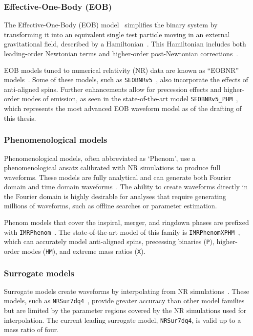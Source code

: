 \subsubsection{Effective-One-Body (EOB)}

The Effective-One-Body (EOB) model~\cite{EOB_1:1998} simplifies the binary system by transforming it into an equivalent single test particle moving in an external gravitational field, described by a Hamiltonian~\cite{EOB_1:1998, EOB_2:2000, EOB_3:2000, EOB_4:2001}. This Hamiltonian includes both leading-order Newtonian terms and higher-order post-Newtonian corrections~\cite{EOB_5:2008}.

EOB models tuned to numerical relativity (NR) data are known as ``EOBNR'' models~\cite{EOB_6:2007}. Some of these models, such as \texttt{SEOBNRv5}~\cite{SEOBNRv5:2023tna}, also incorporate the effects of anti-aligned spins. Further enhancements allow for precession effects and higher-order modes of \gwadj emission, as seen in the state-of-the-art model \texttt{SEOBNRv5\_PHM}~\cite{SEOBNRv5_PHM-Buades:2023ehm}, which represents the most advanced EOB waveform model as of the drafting of this thesis.

\subsubsection{Phenomenological models}

Phenomenological models, often abbreviated as `Phenom', use a phenomenological ansatz calibrated with NR simulations to produce full waveforms. These models are fully analytical and can generate both Fourier domain and time domain waveforms~\cite{IMR_1:2007, IMR_2:2020}. The ability to create waveforms directly in the Fourier domain is highly desirable for analyses that require generating millions of waveforms, such as offline searches or parameter estimation.

Phenom models that cover the inspiral, merger, and ringdown phases are prefixed with \texttt{IMRPhenom}~\cite{IMRPhenomD:2009}. The state-of-the-art model of this family is \texttt{IMRPhenomXPHM}~\cite{IMRPhenomXPHM:2020}, which can accurately model anti-aligned spins, precessing binaries (\texttt{P}), higher-order modes (\texttt{HM}), and extreme mass ratios (\texttt{X}).

\subsubsection{Surrogate models}

Surrogate models create waveforms by interpolating from NR simulations~\cite{Surr_1:2019, Surr_2:2022}. These models, such as \texttt{NRSur7dq4}~\cite{NRSur7dq4:2019}, provide greater accuracy than other model families but are limited by the parameter regions covered by the NR simulations used for interpolation. The current leading surrogate model, \texttt{NRSur7dq4}, is valid up to a mass ratio of four.
